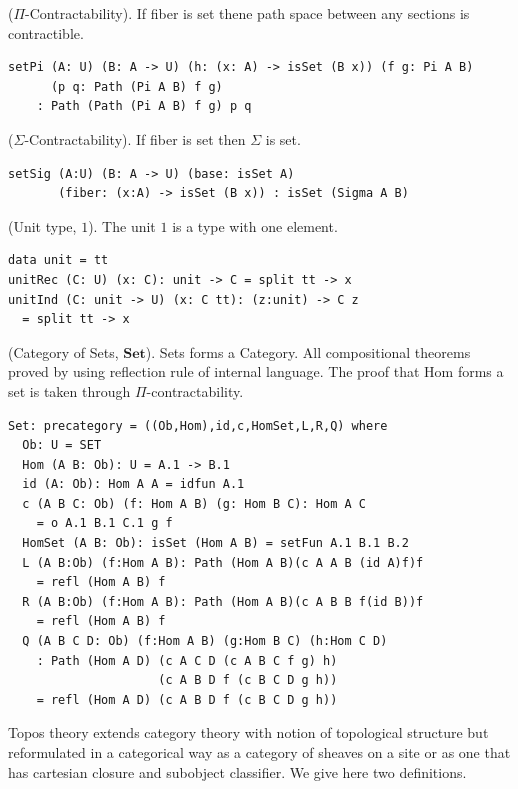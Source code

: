\begin{definition} ($\Pi$-Contractability).
If fiber is set thene path space between any sections is contractible.
\begin{lstlisting}
setPi (A: U) (B: A -> U) (h: (x: A) -> isSet (B x)) (f g: Pi A B)
      (p q: Path (Pi A B) f g)
    : Path (Path (Pi A B) f g) p q
\end{lstlisting}
\end{definition}

\begin{definition} ($\Sigma$-Contractability).
If fiber is set then $\Sigma$ is set.
\begin{lstlisting}
setSig (A:U) (B: A -> U) (base: isSet A)
       (fiber: (x:A) -> isSet (B x)) : isSet (Sigma A B)
\end{lstlisting}
\end{definition}

\begin{definition} (Unit type, $1$).
The unit $1$ is a type with one element.
\begin{lstlisting}
data unit = tt
unitRec (C: U) (x: C): unit -> C = split tt -> x
unitInd (C: unit -> U) (x: C tt): (z:unit) -> C z
  = split tt -> x
\end{lstlisting}
\end{definition}

\begin{theorem} (Category of Sets, $\mathbf{Set}$).
Sets forms a Category.
All compositional theorems proved by using reflection rule of internal language.
The proof that $\mathrm{Hom}$ forms a set is taken through $\Pi$-contractability.
\begin{lstlisting}
Set: precategory = ((Ob,Hom),id,c,HomSet,L,R,Q) where
  Ob: U = SET
  Hom (A B: Ob): U = A.1 -> B.1
  id (A: Ob): Hom A A = idfun A.1
  c (A B C: Ob) (f: Hom A B) (g: Hom B C): Hom A C
    = o A.1 B.1 C.1 g f
  HomSet (A B: Ob): isSet (Hom A B) = setFun A.1 B.1 B.2
  L (A B:Ob) (f:Hom A B): Path (Hom A B)(c A A B (id A)f)f
    = refl (Hom A B) f
  R (A B:Ob) (f:Hom A B): Path (Hom A B)(c A B B f(id B))f
    = refl (Hom A B) f
  Q (A B C D: Ob) (f:Hom A B) (g:Hom B C) (h:Hom C D)
    : Path (Hom A D) (c A C D (c A B C f g) h)
                     (c A B D f (c B C D g h))
    = refl (Hom A D) (c A B D f (c B C D g h))
\end{lstlisting}
\end{theorem}

Topos theory extends category theory with notion of topological
structure but reformulated in a categorical way
as a category of sheaves on a site or as one that has cartesian closure
and subobject classifier. We give here two definitions.

